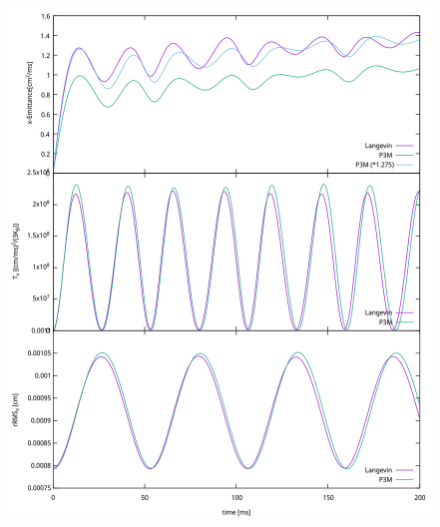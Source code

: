 \documentclass[.08pt,aspectratio=169]{beamer}
\begin{document}
\begin{frame}
\begin{figure}[!htb]
  \label{fig:awesome_image3}
\endminipage
{}%
  \includegraphics[width=1.1\linewidth]{figures/thesis_plot.png}
  \label{fig:awesome_image3}
\endminipage
\end{figure}

\end{frame}
\end{document}
